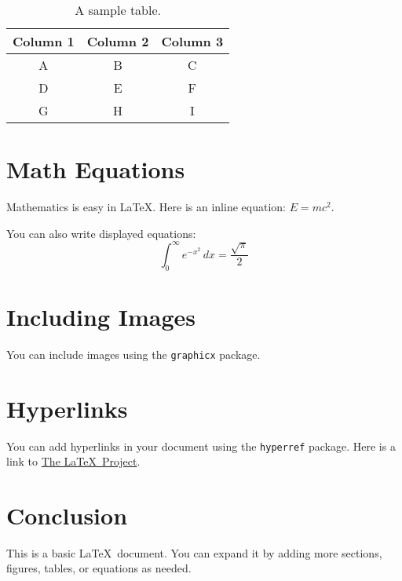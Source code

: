 \documentclass{article}
\begin{document}
\begin{table}[h!]
\centering
\begin{tabular}{|c|c|c|}
\hline
\textbf{Column 1} & \textbf{Column 2} & \textbf{Column 3} \\ \hline
A                & B                 & C                 \\ \hline
D                & E                 & F                 \\ \hline
G                & H                 & I                 \\ \hline
\end{tabular}
\caption{A sample table.}
\end{table}

\section{Math Equations}
Mathematics is easy in \LaTeX. Here is an inline equation: $E = mc^2$.

You can also write displayed equations:
\begin{equation}
\int_0^\infty e^{-x^2} \, dx = \frac{\sqrt{\pi}}{2}
\end{equation}

\section{Including Images}
You can include images using the \texttt{graphicx} package. 

\section{Hyperlinks}
You can add hyperlinks in your document using the \texttt{hyperref} package. Here is a link to \href{https://www.latex-project.org}{The \LaTeX\ Project}.

\section{Conclusion}
This is a basic \LaTeX\ document. You can expand it by adding more sections, figures, tables, or equations as needed.
\end{document}
